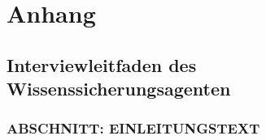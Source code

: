 \documentclass[
  10pt,
  ngerman,
  a4paper,
  toc=graduated,
  numbers=noenddot,
  headings=standardclasses,
  nonumberlist
]{scrartcl}
\begin{document}
\newpage
{}

\begingroup
\raggedright


\endgroup




\newpage
\appendix

\setcounter{page}{1}

\section*{Anhang}

\makeatletter
{}
\makeatother

\setcounter{section}{1}
\setcounter{subsection}{0}



\subsection{Interviewleitfaden des Wissenssicherungsagenten}
\label{anhang_interviewleitfaden}

\subsubsection*{ABSCHNITT: EINLEITUNGSTEXT}
\end{document}
